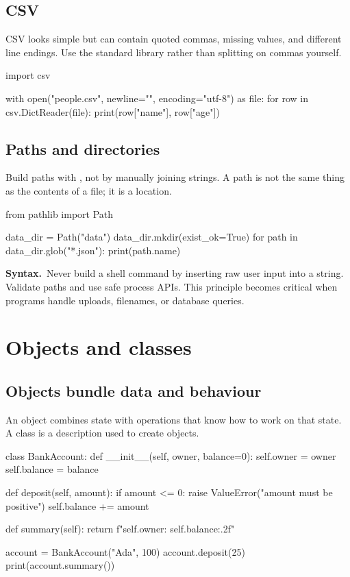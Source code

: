 \documentclass[11pt,openany,oneside]{book}
\newcommand{\inlinecode}[1]{\texttt{\small\detokenize{#1}}}
\newcommand{\syntax}{\textsf{\bfseries\color{orange}Syntax.}\ }
\begin{document}
\section{CSV}

CSV looks simple but can contain quoted commas, missing values, and different line endings. Use the standard library rather than splitting on commas yourself.

\begin{code}[language=Python]
import csv

with open("people.csv", newline="", encoding="utf-8") as file:
    for row in csv.DictReader(file):
        print(row["name"], row["age"])
\end{code}

\section{Paths and directories}

Build paths with \inlinecode{Path}, not by manually joining strings. A path is not the same thing as the contents of a file; it is a location.

\begin{code}[language=Python]
from pathlib import Path

data_dir = Path("data")
data_dir.mkdir(exist_ok=True)
for path in data_dir.glob("*.json"):
    print(path.name)
\end{code}

\begin{warningbox}
\syntax Never build a shell command by inserting raw user input into a string. Validate paths and use safe process APIs. This principle becomes critical when programs handle uploads, filenames, or database queries.
\end{warningbox}

\chapter{Objects and classes}

\section{Objects bundle data and behaviour}

An object combines state with operations that know how to work on that state. A class is a description used to create objects.

\begin{code}[language=Python]
class BankAccount:
    def __init__(self, owner, balance=0):
        self.owner = owner
        self.balance = balance

    def deposit(self, amount):
        if amount <= 0:
            raise ValueError("amount must be positive")
        self.balance += amount

    def summary(self):
        return f"{self.owner}: {self.balance:.2f}"

account = BankAccount("Ada", 100)
account.deposit(25)
print(account.summary())
\end{code}
\end{document}
